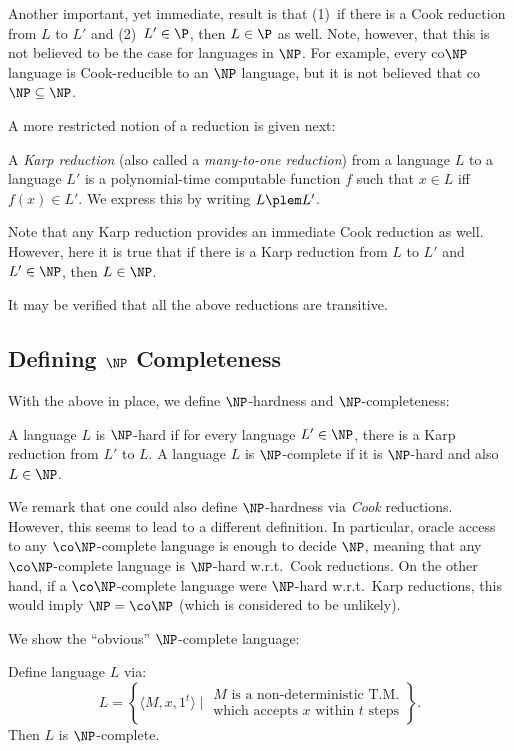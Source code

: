\documentclass[12pt]{article}
\begin{document}
\noindent
Another important, yet immediate, result is that (1)~if there is a Cook
reduction from $L$ to $L'$ and (2)~$L' \in \P$, then
$L \in \P$ as well.
Note, however, that this is not believed to be the case for languages in $\NP$.
For example, every co$\NP$ language is Cook-reducible to an $\NP$ language, but it is not believed that co$\NP \subseteq \NP$.

A more restricted notion of a reduction is given next:

\begin{definition}
A \emph{Karp reduction} (also called a \emph{many-to-one reduction}) from a language $L$ to a language $L'$ is a polynomial-time computable function $f$ such that $x \in L$ iff $f(x) \in L'$. We express this by writing $L \plem L'$.
\end{definition}

\noindent
Note that any Karp reduction provides an immediate Cook reduction as well.
However, here it is true that if there is a Karp reduction from $L$ to $L'$ and $L' \in \NP$, then $L \in \NP$.

\noindent 
It may be verified that all the above reductions are transitive.

\subsection{Defining $\NP$ Completeness}
With the above in place, we define $\NP$-hardness and $\NP$-completeness:

\begin{definition}
A language $L$ is $\NP$-hard if for every language $L' \in \NP$, there is a Karp reduction from $L'$ to $L$. A language $L$ is $\NP$-complete if it is $\NP$-hard and also $L \in \NP$.
\end{definition}

\noindent We remark that one could also define $\NP$-hardness via
\emph{Cook} reductions. However, this seems to lead to a different
definition.  In particular, oracle access to any $\co\NP$-complete
language is enough to decide $\NP$, meaning that any $\co\NP$-complete
language is $\NP$-hard w.r.t.\ Cook reductions. On the other hand, if a
$\co\NP$-complete language were $\NP$-hard w.r.t.\ Karp reductions, this would imply $\NP = \co\NP$ (which is considered to be unlikely).

We show the ``obvious'' $\NP$-complete language:

\begin{theorem}
Define language $L$ via:
\[L = \left\{ \langle M, x, 1^t \rangle \mid \begin{array}{c}\mbox{$M$ is a non-deterministic T.M.}\\
                                                             \mbox{which accepts $x$ within $t$ steps} \end{array} \right\}.\]
Then $L$ is $\NP$-complete.
\end{theorem}
\end{document}
